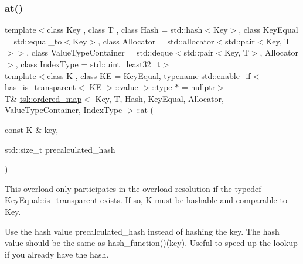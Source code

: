 \subsubsection{\texorpdfstring{at()}{at()}\hspace{0.1cm}{\footnotesize\ttfamily [4/6]}}
{\footnotesize\ttfamily template$<$class Key , class T , class Hash  = std\+::hash$<$\+Key$>$, class Key\+Equal  = std\+::equal\+\_\+to$<$\+Key$>$, class Allocator  = std\+::allocator$<$std\+::pair$<$\+Key, T$>$$>$, class Value\+Type\+Container  = std\+::deque$<$std\+::pair$<$\+Key, T$>$, Allocator$>$, class Index\+Type  = std\+::uint\+\_\+least32\+\_\+t$>$ \\
template$<$class K , class KE  = Key\+Equal, typename std\+::enable\+\_\+if$<$ has\+\_\+is\+\_\+transparent$<$ K\+E $>$\+::value $>$\+::type $\ast$  = nullptr$>$ \\
T\& \mbox{\hyperlink{classtsl_1_1ordered__map}{tsl\+::ordered\+\_\+map}}$<$ Key, T, Hash, Key\+Equal, Allocator, Value\+Type\+Container, Index\+Type $>$\+::at (\begin{DoxyParamCaption}\item[{const K \&}]{key,  }\item[{std\+::size\+\_\+t}]{precalculated\+\_\+hash }\end{DoxyParamCaption})\hspace{0.3cm}{\ttfamily [inline]}}





This overload only participates in the overload resolution if the typedef Key\+Equal\+::is\+\_\+transparent exists. If so, K must be hashable and comparable to Key.

Use the hash value \textquotesingle{}precalculated\+\_\+hash\textquotesingle{} instead of hashing the key. The hash value should be the same as hash\+\_\+function()(key). Useful to speed-\/up the lookup if you already have the hash. \mbox{\label{classtsl_1_1ordered__map_a023f7b34ab4b27c444a03fa0a41abfa6}} 
